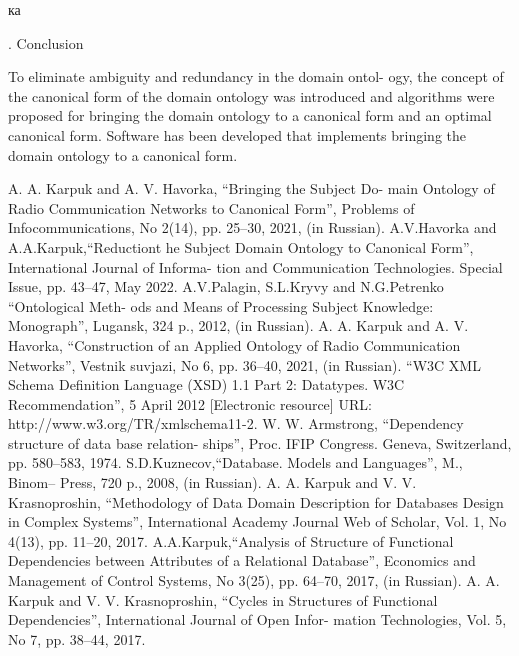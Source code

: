 ка\documentclass[times]{article}
\newcommand{\RomanNumeralCaps}[1]
    {\MakeUppercase{\romannumeral #1}}
\begin{document}
\begin{center}
    \RomanNumeralCaps{7}. Conclusion    
\end{center}

To eliminate ambiguity and redundancy in the domain ontol- ogy, the concept of the canonical form of the domain ontology was introduced and algorithms were proposed for bringing the domain ontology to a canonical form and an optimal canonical form. Software has been developed that implements bringing the domain ontology to a canonical form.



\begin{thebibliography}{196}
    \footnotesize
    \setlength{\itemsep}{1pt}
    \setlength{\parskip}{0pt}
    A. A. Karpuk and A. V. Havorka, “Bringing the Subject Do- main Ontology of Radio Communication Networks to Canonical Form”, Problems of Infocommunications, No 2(14), pp. 25–30, 2021, (in Russian).
    A.V.Havorka and A.A.Karpuk,“Reductiont he Subject Domain Ontology to Canonical Form”, International Journal of Informa- tion and Communication Technologies. Special Issue, pp. 43–47, May 2022.
    A.V.Palagin, S.L.Kryvy and N.G.Petrenko “Ontological Meth- ods and Means of Processing Subject Knowledge: Monograph”, Lugansk, 324 p., 2012, (in Russian).
    A. A. Karpuk and A. V. Havorka, “Construction of an Applied Ontology of Radio Communication Networks”, Vestnik suvjazi, No 6, pp. 36–40, 2021, (in Russian).
    “W3C XML Schema Definition Language (XSD) 1.1 Part 2: Datatypes. W3C Recommendation”, 5 April 2012 [Electronic resource] URL: http://www.w3.org/TR/xmlschema11-2.
    W. W. Armstrong, “Dependency structure of data base relation- ships”, Proc. IFIP Congress. Geneva, Switzerland, pp. 580–583, 1974.
    S.D.Kuznecov,“Database. Models and Languages”, M., Binom– Press, 720 p., 2008, (in Russian).
A. A. Karpuk and V. V. Krasnoproshin, “Methodology of Data Domain Description for Databases Design in Complex Systems”, International Academy Journal Web of Scholar, Vol. 1, No 4(13), pp. 11–20, 2017.
    A.A.Karpuk,“Analysis of Structure of Functional Dependencies between Attributes of a Relational Database”, Economics and Management of Control Systems, No 3(25), pp. 64–70, 2017, (in Russian).
    A. A. Karpuk and V. V. Krasnoproshin, “Cycles in Structures of Functional Dependencies”, International Journal of Open Infor- mation Technologies, Vol. 5, No 7, pp. 38–44, 2017.
    
    
    
    
    
    
\end{thebibliography}
\end{document}
